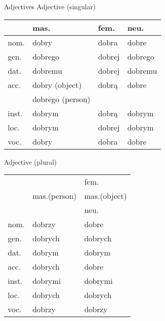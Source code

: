 \documentclass[10pt,twoside]{../filofax2}
\begin{document}
\begin{ffpage}{\Huge Adjectives}
Adjective (singular)
	\begin{tabular}{|m{0.825cm}||m{2.25cm}|m{1.125cm}|m{1.375cm}|}
		\hline
	 	&mas.&fem.&neu.\\ \hline 
		nom.&dobry&dobra&dobre\\ \hline
		gen.&dobrego&dobrej&dobrego\\ \hline
		dat.&dobremu&dobrej&dobremu\\ \hline
		acc.&dobry\scriptsize{ (object)}&dobrą&dobre\\
		    &dobrego\scriptsize{ (person)}      &&\\ \hline
		inst.&dobrym&dobrą&dobrym\\ \hline
		loc.&dobrym&dobrej&dobrym\\ \hline
		voc.&dobry&dobra&dobre\\ \hline
	\end{tabular}

\vspace{1cm}
Adjective (plural)
\begin{tabular}{|m{0.825cm}||m{2.375cm}|m{2.375cm}|}
	\hline
	&                    &fem.\\
	& mas.{\scriptsize (person)}&mas.{\scriptsize (object)}\\
	&                    &neu.\\ \hline
	nom.&dobrzy&dobre\\ \hline
	gen.&dobrych&dobrych\\ \hline
	dat.&dobrym&dobrym\\ \hline
	acc.&dobrych&dobre\\ \hline
	inst.&dobrymi&dobrymi\\ \hline
	loc.&dobrych&dobrych\\ \hline
	voc.&dobrzy&dobrzy\\ \hline
\end{tabular}
\end{ffpage}
\end{document}
